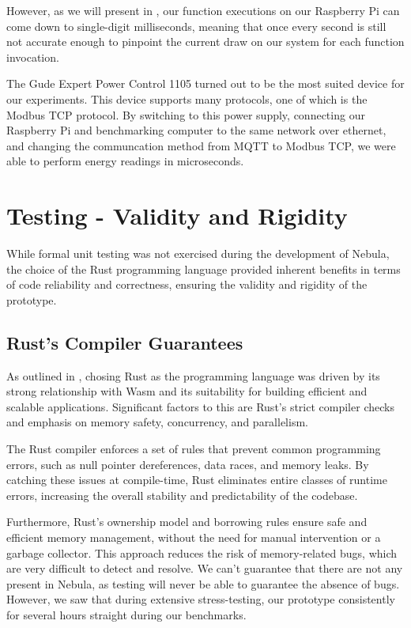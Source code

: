 \documentclass[
  table]{report}
\begin{document}
However, as we will present in , our function
executions on our Raspberry Pi can come down to single-digit
milliseconds, meaning that once every second is still not accurate
enough to pinpoint the current draw on our system for each function
invocation.

The Gude Expert Power Control 1105 turned out to be the most suited
device for our experiments. This device supports many protocols, one of
which is the Modbus TCP protocol. By switching to this power supply,
connecting our Raspberry Pi and benchmarking computer to the same
network over ethernet, and changing the communcation method from
\ac{MQTT} to Modbus TCP, we were able to perform energy readings in
microseconds.

\section{Testing - Validity and Rigidity}

While formal unit testing was not exercised during the development of
Nebula, the choice of the Rust programming language provided inherent
benefits in terms of code reliability and correctness, ensuring the
validity and rigidity of the prototype.

\subsection{Rust's Compiler Guarantees}

As outlined in , chosing Rust as the programming
language was driven by its strong relationship with \ac{Wasm} and its
suitability for building efficient and scalable applications.
Significant factors to this are Rust's strict compiler checks and
emphasis on memory safety, concurrency, and parallelism.

The Rust compiler enforces a set of rules that prevent common
programming errors, such as null pointer dereferences, data races, and
memory leaks. By catching these issues at compile-time, Rust eliminates
entire classes of runtime errors, increasing the overall stability and
predictability of the codebase.

Furthermore, Rust's ownership model and borrowing rules ensure safe and
efficient memory management, without the need for manual intervention or
a garbage collector. This approach reduces the risk of memory-related
bugs, which are very difficult to detect and resolve. We can't guarantee
that there are not any present in Nebula, as testing will never be able
to guarantee the absence of bugs. However, we saw that during extensive
stress-testing, our prototype consistently for several hours straight
during our benchmarks.
\end{document}
